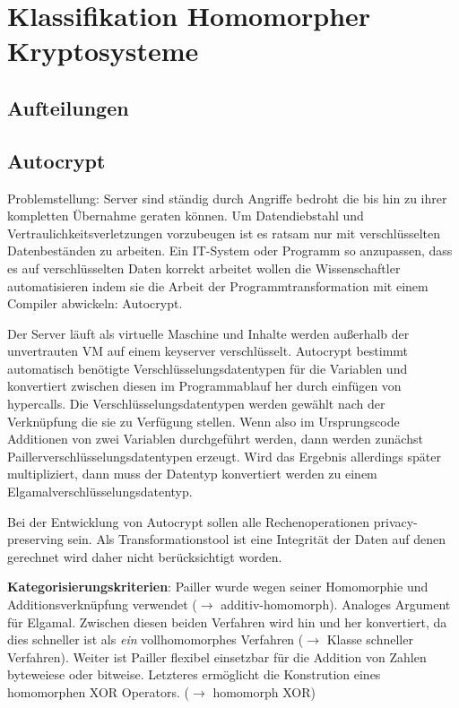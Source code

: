 \chapter{Klassifikation Homomorpher Kryptosysteme}
\section{Aufteilungen}
\section{Autocrypt} \cite{tople2013autocrypt}
Problemstellung: Server sind ständig durch Angriffe bedroht die bis hin zu ihrer kompletten Übernahme geraten können. Um Datendiebstahl und Vertraulichkeitsverletzungen vorzubeugen ist es ratsam nur mit verschlüsselten Datenbeständen zu arbeiten. Ein IT-System oder Programm so anzupassen, dass es auf verschlüsselten Daten korrekt arbeitet wollen die Wissenschaftler automatisieren indem sie die Arbeit der Programmtransformation mit einem Compiler abwickeln: Autocrypt.

Der Server läuft als virtuelle Maschine und Inhalte werden außerhalb der unvertrauten VM auf einem keyserver verschlüsselt. Autocrypt bestimmt automatisch benötigte Verschlüsselungsdatentypen für die Variablen und konvertiert zwischen diesen im Programmablauf her durch einfügen von hypercalls. Die Verschlüsselungsdatentypen werden gewählt nach der Verknüpfung die sie zu Verfügung stellen. Wenn also im Ursprungscode Additionen von zwei Variablen durchgeführt werden, dann werden zunächst Paillerverschlüsselungsdatentypen erzeugt. Wird das Ergebnis allerdings später multipliziert, dann muss der Datentyp konvertiert werden zu einem Elgamalverschlüsselungsdatentyp.

Bei der Entwicklung von Autocrypt sollen alle Rechenoperationen privacy-preserving sein. Als Transformationstool ist eine Integrität der Daten auf denen gerechnet wird daher nicht berücksichtigt worden.

\textbf{Kategorisierungskriterien}: Pailler wurde wegen seiner Homomorphie und Additionsverknüpfung verwendet ($\rightarrow$ additiv-homomorph). Analoges Argument für Elgamal. Zwischen diesen beiden Verfahren wird hin und her konvertiert, da dies schneller ist als \textit{ein} vollhomomorphes Verfahren ($\rightarrow$ Klasse schneller Verfahren). Weiter ist Pailler flexibel einsetzbar für die Addition von Zahlen byteweiese oder bitweise. Letzteres ermöglicht die Konstrution eines homomorphen XOR Operators. ($\rightarrow$ homomorph XOR)

